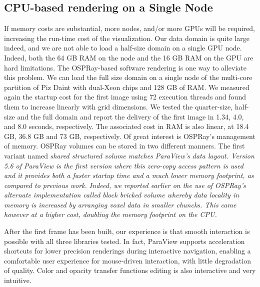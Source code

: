 \documentclass[5p,times]{elsarticle}
\begin{document}
\subsection{CPU-based rendering on a Single Node}
If memory costs are substantial, more nodes, and/or more GPUs will be required,
increasing the run-time cost of the visualization. Our data domain is quite large
indeed, and we are not able to load a half-size domain on a single GPU node. Indeed, both
the 64 GB RAM on the node and the 16 GB RAM on the GPU are hard limitations.
The OSPRay-based software rendering is one way to alleviate this problem. We can load the full size
domain on a single node of  the multi-core partition of Piz Daint with dual-Xeon
chips and 128 GB of RAM. We measured again the startup cost for the first image
using 72 execution threads and found them to increase linearly with grid dimensions.
We tested the quarter-size, half-size and the full domain and report the delivery
of the first image in 1.34, 4.0, and 8.0 seconds, respectively. The associated cost
in RAM is also linear, at 18.4 GB, 36.8 GB and 73 GB, respectively. Of great interest
is OSPRay's management of memory. OSPRay volumes can be stored in two different manners.
The first variant named \it{shared structured volume} \rm matches ParaView's data layout.
Version 5.6 of ParaView is the first version where this zero-copy access pattern is used
and it provides both a faster startup time and a much lower memory footprint, as compared
to previous work. Indeed, we reported earlier on
the use of OSPRay's alternate implementation called \it{block bricked volume} \rm whereby
data locality in memory is increased by arranging voxel data in smaller chuncks. This came
however at a higher cost, doubling the memory footprint on the CPU\cite{SC18ThermalConvection}. 
 
After the first frame has been built, our experience is that smooth interaction
is possible with all three libraries tested. In fact, ParaView supports acceleration
shortcuts for lower precision renderings during interactive navigation,
enabling a comfortable user experience for mouse-driven interaction,
with little degradation of quality. 
Color and opacity transfer functions editing is also interactive and very intuitive.
\end{document}
